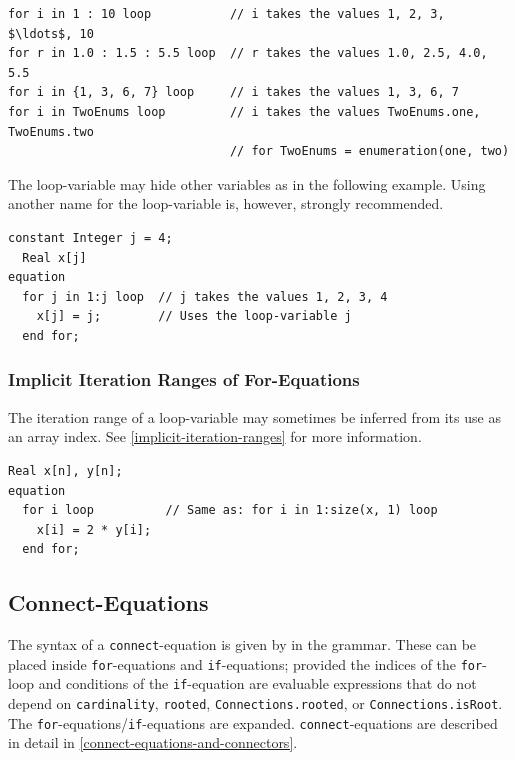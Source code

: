 \begin{example}
\begin{lstlisting}[language=modelica]
for i in 1 : 10 loop           // i takes the values 1, 2, 3, $\ldots$, 10
for r in 1.0 : 1.5 : 5.5 loop  // r takes the values 1.0, 2.5, 4.0, 5.5
for i in {1, 3, 6, 7} loop     // i takes the values 1, 3, 6, 7
for i in TwoEnums loop         // i takes the values TwoEnums.one, TwoEnums.two
                               // for TwoEnums = enumeration(one, two)
\end{lstlisting}

The loop-variable may hide other variables as in the following example.
Using another name for the loop-variable is, however, strongly recommended.
\begin{lstlisting}[language=modelica]
  constant Integer j = 4;
  Real x[j]
equation
  for j in 1:j loop  // j takes the values 1, 2, 3, 4
    x[j] = j;        // Uses the loop-variable j
  end for;
\end{lstlisting}
\end{example}


\subsubsection{Implicit Iteration Ranges of For-Equations}\label{implicit-iteration-ranges-of-for-equations}

The iteration range of a loop-variable may sometimes be inferred from its use as an array index.
See \cref{implicit-iteration-ranges} for more information.

\begin{example}
\begin{lstlisting}[language=modelica]
  Real x[n], y[n];
equation
  for i loop          // Same as: for i in 1:size(x, 1) loop
    x[i] = 2 * y[i];
  end for;
\end{lstlisting}
\end{example}


\subsection{Connect-Equations}\label{connect-equations}

The syntax of a \lstinline!connect!-equation is given by  in the grammar.
These can be placed inside \lstinline!for!-equations and \lstinline!if!-equations; provided the indices of the \lstinline!for!-loop and conditions of the \lstinline!if!-equation are evaluable expressions that do not depend on \lstinline!cardinality!, \lstinline!rooted!, \lstinline!Connections.rooted!, or \lstinline!Connections.isRoot!.
The \lstinline!for!-equations/\lstinline!if!-equations are expanded.
\lstinline!connect!-equations are described in detail in \cref{connect-equations-and-connectors}.

